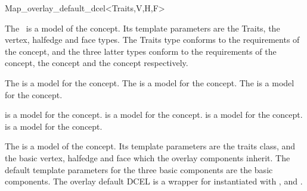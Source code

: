 
\ccRefPageBegin


\begin{ccRefClass}{Map_overlay_default_dcel<Traits,V,H,F>}

\ccDefinition

    The \ccClassTemplateName\ is a model of the  concept. 
    Its template parameters are the Traits, the vertex, halfedge and face
    types. The Traits type conforms to the requirements of the 
     concept, and the three latter types
    conform to the requirements of the  concept,
    the  concept and the 
    concept respectively.


\ccIsModel

The  is a model for the 
 concept. 
The  is a
model for the  concept.
The  is a
model for the  concept. 

 is a model for the  concept.
 is a model for the  concept.
 is a model for the  concept.
 is a model for the  concept.



The 
is a model of the  concept. 
Its template parameters are the traits class, 
and the basic vertex, halfedge and face which the overlay components inherit.
The default template parameters for the three basic components are the 
 basic components.
The overlay default DCEL is a wrapper for  instantiated 
with ,
 and 
.


\end{ccRefClass}
\ccRefPageEnd
